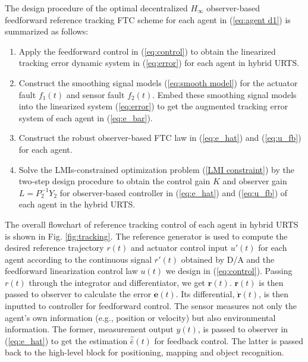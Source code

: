 \documentclass[journal,12pt,onecolumn,draftclsnofoot,]{IEEEtran}
\begin{document}
The design procedure of the optimal decentralized $H_\infty$ observer-based feedforward reference tracking FTC scheme for each agent in (\ref{eq:agent d1}) is summarized as follows:
\begin{enumerate}
    \item Apply the feedforward control in (\ref{eq:control}) to obtain the linearized tracking error dynamic system in (\ref{eq:error}) for each agent in hybrid URTS.
    \item Construct the smoothing signal models (\ref{eq:smooth model}) for the actuator fault $f_1(t)$ and sensor fault $f_2(t)$. Embed these smoothing signal models into the linearized system (\ref{eq:error}) to get the augmented tracking error system of each agent in (\ref{eq:e_bar}).
    \item Construct the robust observer-based FTC law in (\ref{eq:e_hat}) and (\ref{eq:u_fb}) for each agent.
    \item Solve the LMIs-constrained optimization problem (\ref{LMI constraint}) by the two-step design procedure to obtain the control gain $K$ and observer gain $L=P_2^{-1}Y_2$ for observer-based controller in (\ref{eq:e_hat}) and (\ref{eq:u_fb}) of each agent in the hybrid URTS.
\end{enumerate}

The overall flowchart of reference tracking control of each agent in hybrid URTS is shown in Fig. \ref{fig:tracking}. The reference generator is used to compute the desired reference trajectory $r(t)$ and actuator control input $u'(t)$ for each agent according to the continuous signal $r'(t)$ obtained by D/A and the feedforward linearization control law $u(t)$ we design in (\ref{eq:control}). Passing $r(t)$ through the integrator and differentiator, we get $\pmb{r}(t)$. $\pmb{r}(t)$ is then passed to observer to calculate the error $\pmb{e}(t)$. Its differential, $\dot{\pmb{r}}(t)$, is then inputted to controller for feedforward control. The sensor measures not only the agent's own information (e.g., position or velocity) but also environmental information. The former, measurement output $y(t)$, is passed to observer in (\ref{eq:e_hat}) to get the estimation $\hat{\bar{e}}(t)$ for feedback control. The latter is passed back to the high-level block for positioning, mapping and object recognition.
\end{document}

